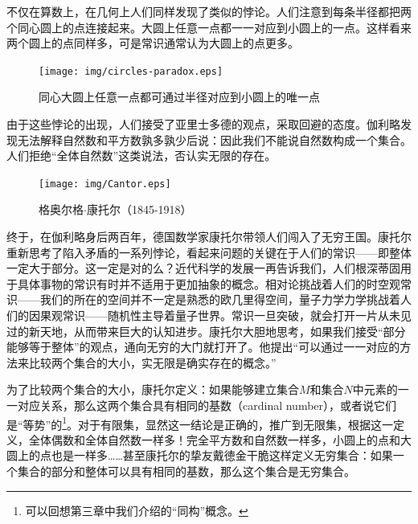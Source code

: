 \documentclass{article}
\begin{document}
不仅在算数上，在几何上人们同样发现了类似的悖论。人们注意到每条半径都把两个同心圆上的点连接起来。大圆上任意一点都一一对应到小圆上的一点。这样看来两个圆上的点同样多，可是常识通常认为大圆上的点更多。

\begin{figure}[htbp]
 \centering
 \texttt{[image: img/circles-paradox.eps]}
 \caption{同心大圆上任意一点都可通过半径对应到小圆上的唯一点}
 \label{fig:circles-paradox}
\end{figure}

由于这些悖论的出现，人们接受了亚里士多德的观点，采取回避的态度。伽利略发现无法解释自然数和平方数孰多孰少后说：因此我们不能说自然数构成一个集合。人们拒绝“全体自然数”这类说法，否认实无限的存在。

\begin{figure}
 \centering
 \texttt{[image: img/Cantor.eps]}
 \captionsetup{labelformat=empty}
 \caption{格奥尔格$\cdot$康托尔（1845-1918）}
 \label{fig:Cantor}
\end{figure}

终于，在伽利略身后两百年，德国数学家康托尔带领人们闯入了无穷王国。康托尔重新思考了陷入矛盾的一系列悖论，看起来问题的关键在于人们的常识——即整体一定大于部分。这一定是对的么？近代科学的发展一再告诉我们，人们根深蒂固用于具体事物的常识有时并不适用于更加抽象的概念。相对论挑战着人们的时空观常识——我们的所在的空间并不一定是熟悉的欧几里得空间，量子力学力学挑战着人们的因果观常识——随机性主导着量子世界。常识一旦突破，就会打开一片从未见过的新天地，从而带来巨大的认知进步。康托尔大胆地思考，如果我们接受“部分能够等于整体”的观点，通向无穷的大门就打开了。他提出“可以通过一一对应的方法来比较两个集合的大小，实无限是确实存在的概念。”

为了比较两个集合的大小，康托尔定义：如果能够建立集合$M$和集合$N$中元素的一一对应关系，那么这两个集合具有相同的基数（cardinal number），或者说它们是“等势”的\footnote{可以回想第三章中我们介绍的“同构”概念。}。对于有限集，显然这一结论是正确的，推广到无限集，根据这一定义，全体偶数和全体自然数一样多！完全平方数和自然数一样多，小圆上的点和大圆上的点也是一样多……甚至康托尔的挚友戴徳金干脆这样定义无穷集合：如果一个集合的部分和整体可以具有相同的基数，那么这个集合是无穷集合。

\end{document}
